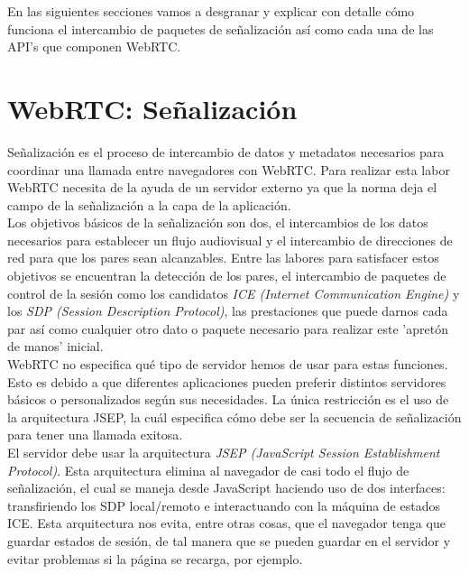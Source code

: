 En las siguientes secciones vamos a desgranar y explicar con detalle cómo funciona el intercambio de paquetes de señalización así como cada una de las API's que componen WebRTC.\\

\section{WebRTC: Señalización} 
\label{sec:senalizacion}

Señalización es el proceso de intercambio de datos y metadatos necesarios para coordinar una llamada entre navegadores con WebRTC. Para realizar esta labor WebRTC necesita de la ayuda de un servidor externo ya que la norma deja el campo de la señalización a la capa de la aplicación.\\

Los objetivos básicos de la señalización son dos, el intercambios de los datos necesarios para establecer un flujo audiovisual y el intercambio de direcciones de red para que los pares sean alcanzables. Entre las labores para satisfacer estos objetivos se encuentran la detección de los pares, el intercambio de paquetes de control de la sesión como los candidatos \emph{ICE (Internet Communication Engine)} y los \emph{SDP (Session Description Protocol)}, las prestaciones que puede darnos cada par así como cualquier otro dato o paquete necesario para realizar este 'apretón de manos' inicial.\\

WebRTC no especifica qué tipo de servidor hemos de usar para estas funciones. Esto es debido a que diferentes aplicaciones pueden preferir distintos servidores básicos o personalizados según sus necesidades. La única restricción es el uso de la arquitectura JSEP, la cuál especifica cómo debe ser la secuencia de señalización para tener una llamada exitosa.\\


El servidor debe usar la arquitectura \emph{JSEP (JavaScript Session Establishment Protocol)}. Esta arquitectura elimina al navegador de casi todo el flujo de señalización, el cual se maneja desde JavaScript haciendo uso de dos interfaces: transfiriendo los SDP local/remoto e interactuando con la máquina de estados ICE. Esta arquitectura nos evita, entre otras cosas, que el navegador tenga que guardar estados de sesión, de tal manera que se pueden guardar en el servidor y evitar problemas si la página se recarga, por ejemplo. \\

